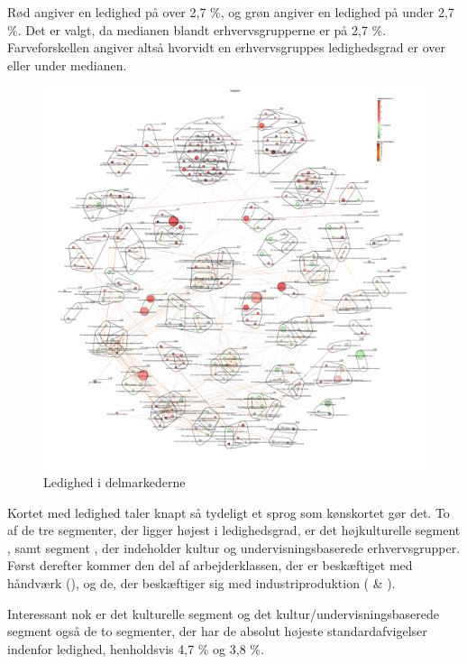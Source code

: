 Rød angiver en ledighed på over 2,7 \%, og grøn angiver en ledighed på under 2,7 \%. Det er valgt, da medianen blandt erhvervsgrupperne er på 2,7 \%. Farveforskellen angiver altså hvorvidt en  erhvervsgruppes ledighedsgrad er over eller under medianen. 


%
\begin{figure}[H]
\begin{center}
  \caption{Ledighed i delmarkederne}
  \label{fig_delanalyse1_kort_ledighed}
  \includegraphics[width=1.0\textwidth]{fig/netvaerkskort/kort_ledighed.pdf}
\end{center}
\end{figure}
\restoregeometry
%

 
Kortet med ledighed taler knapt så tydeligt et sprog som kønskortet gør det. To af de tre segmenter, der ligger højest i ledighedsgrad, er det højkulturelle segment , samt segment , der indeholder kultur og undervisningsbaserede erhvervsgrupper. Først derefter kommer den del af arbejderklassen, der er beskæftiget med håndværk (), og de, der beskæftiger sig med industriproduktion ( \& ). 

Interessant nok er det kulturelle segment og det kultur/undervisningsbaserede segment også de to segmenter, der har de absolut højeste standardafvigelser indenfor ledighed, henholdsvis 4,7 \% og 3,8 \%. 


